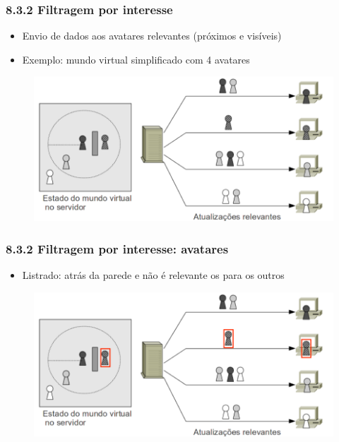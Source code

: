 \documentclass{beamer}
\begin{document}
\begin{frame} 
  \frametitle{8.3.2 Filtragem por interesse}
  \begin{itemize}
    \item Envio de dados aos avatares relevantes (próximos e visíveis)
    \item Exemplo: mundo virtual simplificado com 4 avatares
  \end{itemize}
  \begin{figure}[h]
    \centering
    \vspace{-18pt}
    \includegraphics[width=1.03\textwidth]{imagem_82.png}
    \vspace{-20pt}
  \end{figure}
\end{frame}

\begin{frame} 
  \frametitle{8.3.2 Filtragem por interesse: avatares}
  \begin{itemize}
    \item Listrado: atrás da parede e não é relevante os para os outros
  \end{itemize}
  \begin{figure}[h]
    \centering
    \vspace{-18pt}
    \includegraphics[width=1.03\textwidth]{imagem_82_Listrado.png}
    \vspace{-20pt}
  \end{figure}
\end{frame}
\end{document}
